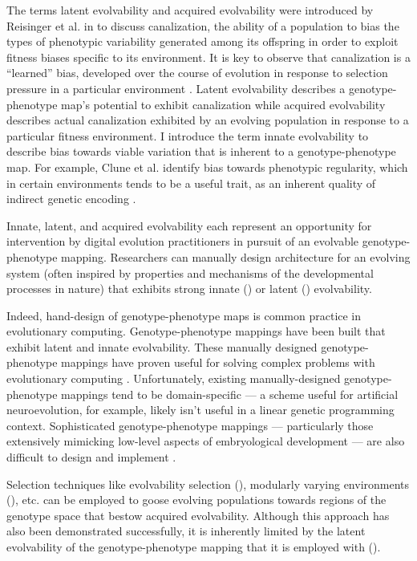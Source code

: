 The terms latent evolvability and acquired evolvability were introduced by Reisinger et al. in \cite{reisinger2005towards} to discuss canalization, the ability of a population to bias the types of phenotypic variability generated among its offspring in order to exploit fitness biases specific to its environment.
It is key to observe that canalization is a ``learned'' bias, developed over the course of evolution in response to selection pressure in a particular environment \cite{reisinger2005towards}.
Latent evolvability describes a genotype-phenotype map's potential to exhibit canalization while acquired evolvability describes actual canalization exhibited by an evolving population in response to a particular fitness environment.
I introduce the term innate evolvability to describe bias towards viable variation that is inherent to a genotype-phenotype map.
For example, Clune et al. identify bias towards phenotypic regularity, which in certain environments tends to be a useful trait, as an inherent quality of indirect genetic encoding \cite{clune2008generative}.

Innate, latent, and acquired evolvability each represent an opportunity for intervention by digital evolution practitioners in pursuit of an evolvable genotype-phenotype mapping.
Researchers can manually design architecture for an evolving system (often inspired by properties and mechanisms of the developmental processes in nature) that exhibits strong innate (\cite{clune2011performance}) or latent (\cite{reisinger2005towards}) evolvability.

Indeed, hand-design of genotype-phenotype maps is common practice in evolutionary computing.
Genotype-phenotype mappings have been built that exhibit latent \cite{reisinger2007acquiring} and innate \cite{stanley2009hypercube, clune2011performance} evolvability.
These manually designed genotype-phenotype mappings have proven useful for solving complex problems with evolutionary computing \cite{woolley2010evolving}.
Unfortunately, existing manually-designed genotype-phenotype mappings tend to be domain-specific --- a scheme useful for artificial neuroevolution, for example, likely isn't useful in a linear genetic programming context.
Sophisticated genotype-phenotype mappings --- particularly those extensively mimicking low-level aspects of embryological development --- are also difficult to design and implement \cite[p 223]{downing2015intelligence}.

Selection techniques like evolvability selection (\cite{mengistu2016evolvability}), modularly varying environments (\cite{kashtan2005spontaneous}), etc. can be employed to goose evolving populations towards regions of the genotype space that bestow acquired evolvability.
Although this approach has also been demonstrated successfully, it is inherently limited by the latent evolvability of the genotype-phenotype mapping that it is employed with (\cite{reisinger2005towards}).

